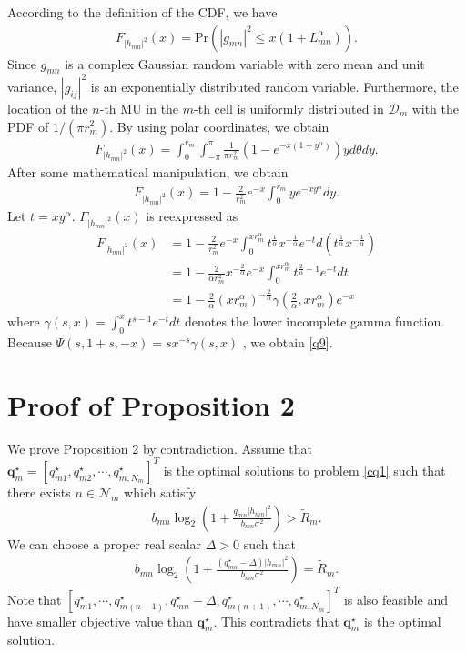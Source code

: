 \documentclass[journal]{IEEEtran}
\begin{document}
According to the definition of the CDF, we have
\begin{align}
F_{\left|h_{mn} \right|^2} \left(x\right)=\mbox{Pr}\left(\left|g_{mn}\right|^2 \leq x \left(1 + L_{mn}^\alpha\right)\right).
\end{align}
Since $g_{mn}$ is a complex Gaussian random variable with zero mean and unit variance,  $\left|g_{ij}\right|^2$ is an exponentially distributed random variable.
Furthermore, the location of the $n$-th MU in the $m$-th cell is uniformly distributed in $\mathcal{D}_m$ with the PDF of $1/(\pi r_m^2)$. By using polar coordinates, we obtain
\begin{align}
F_{\left|h_{mn}\right|^2} \left(x\right)= \int_{0}^{r_m} \int_{-\pi}^{\pi}\frac{1}{\pi r_m^2}\left(1 - e^{-x\left(1 + y^{\alpha}\right)}\right)y d \theta d y.
\end{align}
After some mathematical manipulation, we obtain
\begin{align}
F_{\left|h_{mn}\right|^2} \left(x\right)=1-\frac{2}{r_m^2}e^{-x} \int_{0}^{r_m}y e^{-xy^{\alpha}}dy.
\end{align}
Let $t = xy^{\alpha}$. $F_{\left|h_{mn}\right|^2} \left(x\right)$ is reexpressed as
\begin{align}
F_{\left|h_{mn}\right|^2} \left(x\right) &= 1 - \frac{2}{r_m^2}e^{-x} \int_{0}^{x r_m^{\alpha}} t^{\frac{1}{\alpha}} x^{-\frac{1}{\alpha}}e^{-t} d\left(t^{\frac{1}{\alpha}} x^{-\frac{1}{\alpha}}\right)\nonumber\\
& = 1 - \frac{2}{\alpha r_m^2}x^{-\frac{2}{\alpha}} e^{-x} \int_{0}^{x r_m^{\alpha}} t^{\frac{2}{\alpha} - 1}e^{-t} dt\nonumber\\
& = 1 - \frac{2}{\alpha} \left(x r_m^{\alpha}\right) ^{-\frac{2}{\alpha}} \gamma\left(\frac{2}{\alpha}, x r_m^{\alpha}\right)e^{-x}
\end{align}
where $\gamma\left(s,x\right) = \int_{0}^{x}t^{s-1}e^{-t}dt$ denotes the lower incomplete gamma function. Because $\Psi\left(s,1+s,-x\right)=sx^{-s}\gamma\left(s,x\right)$ \cite[6.5.12]{MAbramowitz}, we obtain \eqref{q9}.

\section{Proof of Proposition 2}

We prove Proposition 2 by contradiction. Assume that $\mathbf{q}_m^\star=[q_{m1}^\star, q_{m2}^\star, \cdots, q_{m,N_m}^\star]^T$ is the optimal solutions to problem \eqref{cq1} such that there exists $n\in\mathcal{N}_m$ which satisfy
\begin{align}
b_{mn}\log_2\left(1 + \frac{q_{mn}\left|h_{mn}\right|^2}{b_{mn}\sigma^2}\right)>\tilde{R}_m.
\end{align}
We can choose a proper real scalar $\Delta>0$ such that
\begin{align}
b_{mn}\log_2\left(1 + \frac{(q_{mn}^\star-\Delta)\left|h_{mn}\right|^2}{b_{mn}\sigma^2}\right)=\tilde{R}_m.
\end{align}
Note that $[q_{m1}^\star, \cdots, q_{m(n-1)}^\star, q_{mn}^\star-\Delta, q_{m(n+1)}^\star, \cdots, q_{m,N_m}^\star]^T$ is also feasible and have smaller objective value than $\mathbf{q}_m^\star$. This contradicts that $\mathbf{q}_m^\star$ is the optimal solution.
\end{document}
